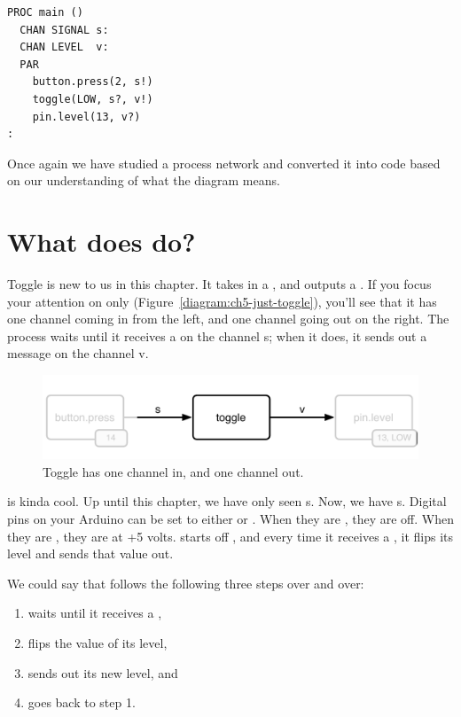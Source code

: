 \vspace{3mm}
\begin{lstlisting}
PROC main ()
  CHAN SIGNAL s:
  CHAN LEVEL  v:
  PAR
    button.press(2, s!)
    toggle(LOW, s?, v!)
    pin.level(13, v?)
:
\end{lstlisting}

Once again we have studied a process network and converted it into code based on our understanding of what the diagram means. 

\section{What does \toggle do?}

Toggle is new to us in this chapter. It takes in a \SIGNALT, and outputs a \LEVELT. If you focus your attention on \toggle only (Figure~\vref{diagram:ch5-just-toggle}), you'll see that it has one channel coming in from the left, and one channel going out on the right. The \toggle process waits until it receives a \SIGNALV on the channel {\code s}; when it does, it sends out a message on the channel {\code v}. 

\begin{figure}[ht]
  \begin{center}
    \includegraphics[width=\linewidth]{images/ch5-just-toggle}
    \caption{Toggle has one channel in, and one channel out.}
    \label{diagram:ch5-just-toggle}
  \end{center}
\end{figure}

\toggle is kinda cool. Up until this chapter, we have only seen {\SIGNALT}s. Now, we have {\LEVELT}s. Digital pins on your Arduino can be set to either \HIGH or \LOW. When they are \LOW, they are off. When they are \HIGH, they are at +5 volts. \toggle starts off \LOW, and every time it receives a \SIGNALT, it flips its level and sends that value out. 

\newpage

We could say that \toggle follows the following three steps over and over:

\vspace{3mm}
\begin{enumerate}
	\item \toggle waits until it receives a \SIGNALT, 
	\item flips the value of its level,
	\item sends out its new level, and 
	\item goes back to step 1.
\end{enumerate}

